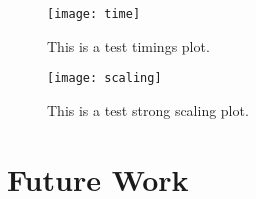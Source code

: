 \begin{figure}
\texttt{[image: time]}
\caption{This is a test timings plot.}
\end{figure}

\begin{figure}
\texttt{[image: scaling]}
\caption{This is a test strong scaling plot.}
\end{figure}

\section{Future Work}

%
